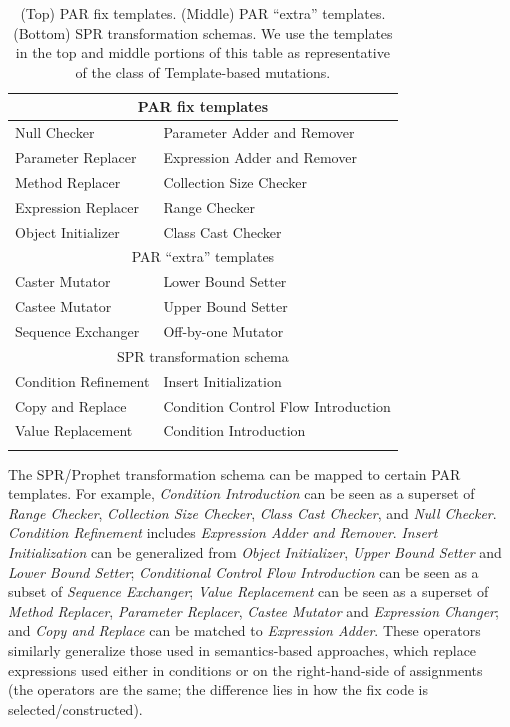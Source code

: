 \documentclass[conference]{IEEEtran}
\begin{document}
\begin{table}[ht]
  \centering
{\small
\begin{tabular}{ll}
\toprule
\multicolumn{2}{c}{PAR fix templates} \\
\midrule
Null Checker & Parameter Adder and Remover \\ 
Parameter Replacer & Expression Adder and Remover \\  
Method Replacer & Collection Size Checker \\
Expression Replacer &  Range Checker\\
Object Initializer & Class Cast Checker\\
\midrule
\multicolumn{2}{c}{PAR ``extra'' templates} \\
\midrule
Caster Mutator & Lower Bound Setter  \\
Castee Mutator & Upper Bound Setter  \\
Sequence Exchanger & Off-by-one Mutator\\
\midrule
\multicolumn{2}{c}{SPR transformation schema} \\
\midrule
Condition Refinement & Insert Initialization \\
Copy and Replace & Condition Control Flow Introduction  \\
Value Replacement  & Condition Introduction \\

\vspace{1pt}
\end{tabular}
  \caption{(Top) PAR fix templates. (Middle) PAR ``extra'' templates. (Bottom)
    SPR transformation schemas. We use the templates in the top and middle
    portions of this table as representative of the class of Template-based mutations. \label{approachTemplates}}
}

\end{table}

The SPR/Prophet transformation schema can be mapped to certain PAR 
templates. For example, \emph{Condition Introduction} can be seen as a superset of 
\emph{Range Checker}, \emph{Collection Size 
Checker}, \emph{Class Cast Checker}, and \emph{Null Checker}. \emph{Condition Refinement} includes \emph{Expression Adder and Remover}. \emph{Insert Initialization} can be 
generalized from \emph{Object Initializer}, \emph{Upper Bound Setter} and \emph{Lower Bound Setter}; \emph{Conditional Control Flow Introduction} can be 
seen as a subset of \emph{Sequence Exchanger};
\emph{Value Replacement} can be seen as a superset of \emph{Method 
Replacer}, \emph{Parameter Replacer}, \emph{Castee Mutator} and \emph{Expression Changer}; and \emph{Copy 
and Replace} can be matched to \emph{Expression Adder}. 
These operators similarly generalize those used in semantics-based approaches,
which replace expressions used either in conditions or on the right-hand-side of
assignments (the operators are the same; the difference lies in how the fix code
is selected/constructed). 
\end{document}
